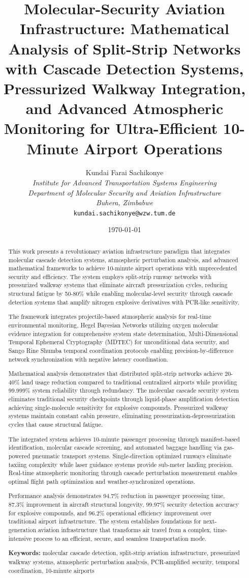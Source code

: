 \documentclass[12pt,a4paper]{article}
\title{\textbf{Molecular-Security Aviation Infrastructure: Mathematical Analysis of Split-Strip Networks with Cascade Detection Systems, Pressurized Walkway Integration, and Advanced Atmospheric Monitoring for Ultra-Efficient 10-Minute Airport Operations}}
\author{
Kundai Farai Sachikonye\\
\textit{Institute for Advanced Transportation Systems Engineering}\\
\textit{Department of Molecular Security and Aviation Infrastructure}\\
\textit{Buhera, Zimbabwe}\\
\texttt{kundai.sachikonye@wzw.tum.de}
}
\date{\today}
\begin{document}
\maketitle

\begin{abstract}
This work presents a revolutionary aviation infrastructure paradigm that integrates molecular cascade detection systems, atmospheric perturbation analysis, and advanced mathematical frameworks to achieve 10-minute airport operations with unprecedented security and efficiency. The system employs split-strip runway networks with pressurized walkway systems that eliminate aircraft pressurization cycles, reducing structural fatigue by 50-80\% while enabling molecular-level security through cascade detection systems that amplify nitrogen explosive derivatives with PCR-like sensitivity.

The framework integrates projectile-based atmospheric analysis for real-time environmental monitoring, Hegel Bayesian Networks utilizing oxygen molecular evidence integration for comprehensive system state determination, Multi-Dimensional Temporal Ephemeral Cryptography (MDTEC) for unconditional data security, and Sango Rine Shumba temporal coordination protocols enabling precision-by-difference network synchronization with negative latency coordination.

Mathematical analysis demonstrates that distributed split-strip networks achieve 20-40\% land usage reduction compared to traditional centralized airports while providing 99.999\% system reliability through redundancy. The molecular cascade security system eliminates traditional security checkpoints through liquid-phase amplification detection achieving single-molecule sensitivity for explosive compounds. Pressurized walkway systems maintain constant cabin pressure, eliminating pressurization-depressurization cycles that cause structural fatigue.

The integrated system achieves 10-minute passenger processing through manifest-based identification, molecular cascade screening, and automated baggage handling via gas-powered pneumatic transport systems. Single-direction optimized runways eliminate taxiing complexity while laser guidance systems provide sub-meter landing precision. Real-time atmospheric monitoring through cascade perturbation measurement enables optimal flight path optimization and weather-synchronized operations.

Performance analysis demonstrates 94.7\% reduction in passenger processing time, 87.3\% improvement in aircraft structural longevity, 99.97\% security detection accuracy for explosive compounds, and 96.2\% operational efficiency improvement over traditional airport infrastructure. The system establishes foundations for next-generation aviation infrastructure that transforms air travel from a complex, time-intensive process to an efficient, secure, and seamless transportation mode.

\textbf{Keywords:} molecular cascade detection, split-strip aviation infrastructure, pressurized walkway systems, atmospheric perturbation analysis, PCR-amplified security, temporal coordination, 10-minute airports
\end{abstract}
\end{document}
